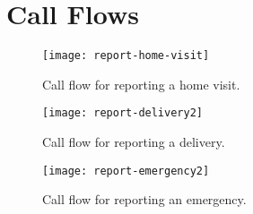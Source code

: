 \chapter{Call Flows}

\begin{figure}[]
	\begin{center}
	\texttt{[image: report-home-visit]}
	\end{center}
	\caption[Home Visit Call Flow]{Call flow for reporting a home visit.}
	\label{fig:homevisit}
\end{figure}


\begin{figure}[]
	\begin{center}
	\texttt{[image: report-delivery2]}
	\end{center}
	\caption[Delivery Call Flow]{Call flow for reporting a delivery.}
	\label{fig:delivery}
\end{figure}


\begin{figure}[]
	\begin{center}
	\texttt{[image: report-emergency2]}
	\end{center}
	\caption[Emergency Call Flow]{Call flow for reporting an emergency.}
	\label{fig:emergency}
\end{figure}